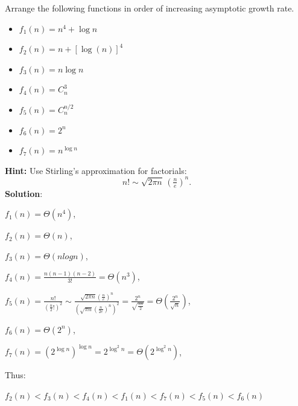 \problem{}

\par Arrange the following functions in order of increasing asymptotic growth rate.

\begin{itemize}
    \item \( f_1(n) = n^4 + \log n \)
    \item \( f_2(n) = n + \left[\log(n)\right]^4 \)
    \item \( f_3(n) = n \log n \)
\item \( f_4(n) = C_n^3 \)
\item \( f_5(n) = C_n^{n/2} \)
    \item \( f_6(n) = 2^n \)
    \item \( f_7(n) = n^{\log n} \)
\end{itemize}

\noindent \textbf{Hint:}  
Use Stirling’s approximation for factorials:  
\[
n! \sim \sqrt{2\pi n}\,\left(\tfrac{n}{e}\right)^n.
\]
\textbf{Solution}:

\noindent$f_1(n) = \Theta(n^4)$,

\noindent$f_2(n) = \Theta(n)$,

\noindent$f_3(n) = \Theta(nlogn)$,

\noindent$f_4(n) = \frac{n(n-1)(n-2)}{3!} = \Theta(n^{3})$,

\noindent$f_5(n) = \frac{n!}{(\frac{n}{2}!)^2} \sim \frac{\sqrt{2\pi n}(\frac{n}{e})^n}{(\sqrt{\pi n}(\frac{n}{2e})^n)^2} = \frac{2^n}{\sqrt{\frac{\pi n}{2}}}= \Theta(\frac{2^n}{\sqrt{n}})$,

\noindent$f_6(n) =  \Theta(2^n)$,

\noindent$f_7(n) =  (2^{\log n})^{\log n} = 2^{\log^2 n}= \Theta(2^{\log^2 n})$,


\noindent Thus:

$f_2(n)<f_3(n)<f_4(n)<f_1(n)<f_7(n)<f_5(n)<f_6(n)$
\newpage
